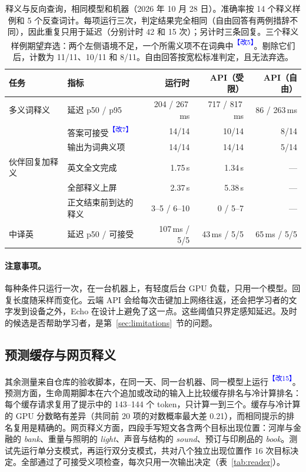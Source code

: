 \documentclass[11pt,a4paper,fontset=windows]{ctexart}
\newcommand{\audit}[1]{\textcolor{blue}{\textsuperscript{【改#1】}}}
\begin{document}
\begin{table}[ht]
\centering\footnotesize\setlength{\tabcolsep}{4pt}
\begin{tabular}{@{}llrrr@{}}
\toprule
任务 & 指标 & 运行时 & API（受限） & API（自由）\\
\midrule
多义词释义 & 延迟 p50 / p95 & 204 / 267\,ms & 717 / 817\,ms & 86 / 263\,ms\\
 & 答案可接受\audit{7} & 14/14 & 10/14 & 8/14\\
 & 输出为词典义项 & 14/14 & 14/14 & 5/14\\
\addlinespace
伙伴回复加释义 & 英文全文完成 & 1.75\,s & 1.34\,s & ---\\
 & 全部释义上屏 & 2.37\,s & 5.38\,s & ---\\
 & 正文结束前到达的释义 & 3--5 / 6--10 & 0 / 5--7 & ---\\
\addlinespace
中译英 & 延迟 p50 / 可接受 & 107\,ms / 5/5 & 43\,ms / 5/5 & 65\,ms / 5/5\\
\bottomrule
\end{tabular}
\caption{释义与反向查询，相同模型和机器（2026 年 10 月 28 日）。准确率按 14 个释义样例和 5 个反查词计。每项运行三次，判定结果完全相同（自由回答有两例措辞不同），因此重复只用于延迟（分别计时 42 和 15 次）；另计时三条回复。三个释义样例期望弃选：两个左侧语境不足，一个所需义项不在词典中\audit{5}。剔除它们后，计数为 11/11、10/11 和 8/11。自由回答按宽松标准判定，且无法弃选。}
\label{tab:comparison}
\end{table}

\paragraph{注意事项。}每种条件只运行一次，在一台机器上，有轻度后台 GPU 负载，只用一个模型。回复长度随采样而变化。云端 API 会给每次击键加上网络往返，还会把学习者的文字发到设备之外，Echo 在设计上避免了这一点。这些阈值只界定感知延迟。及时的候选是否帮助学习者，是第~\ref{sec:limitations}~节的问题。

\subsection{预测缓存与网页释义}
其余测量来自仓库的验收脚本，在同一天、同一台机器、同一模型上运行\audit{15}。预测方面，生命周期脚本在六个追加或改动的输入上比较缓存排名与冷计算排名：每个缓存请求复用了提示中的 143--144 个 token，只计算一到三个。缓存与冷计算的 GPU 分数略有差异（共同前 20 项的对数概率最大差 0.21），而相同提示的排名复用是精确的。网页释义方面，四段手写短文各含两个目标出现位置：河岸与金融的 \emph{bank}、重量与照明的 \emph{light}、声音与结构的 \emph{sound}、预订与印刷品的 \emph{book}。测试先运行单分支模式，再运行双分支模式，共对八个独立出现位置作 16 次目标决定。全部通过了可接受义项检查，每次只用一次输出决定（表~\ref{tab:reader}）。
\end{document}
